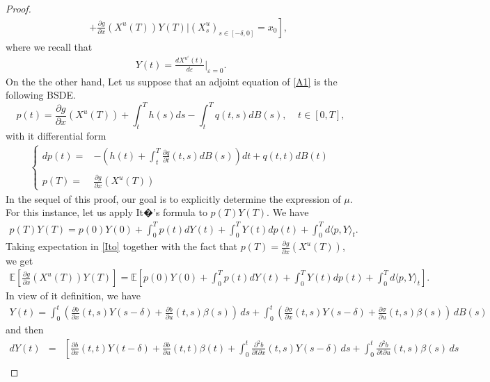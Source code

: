 \documentclass[12pt]{article}
\theoremstyle{remark}
\numberwithin{equation}{section}
\def\E{\mathbb E}
\def\E{\mathbb E}
\begin{document}
\begin{proof}
\begin{eqnarray}
&&\left.+\frac{\partial g}{\partial x}(X^{u}(T))Y(T)\Big|(X^{u}_s)_{s\in[-\delta,0]}=x_0 \right],  
\end{eqnarray}
where we recall that
\begin{eqnarray*}
	Y(t)=\frac{dX^{u^{\varepsilon}}(t)}{d\varepsilon}|_{\varepsilon=0}.
\end{eqnarray*}
On the the other hand, Let us suppose that an adjoint equation of \eqref{A1} is 
the following BSDE.
\begin{equation*}
p(t) = \frac{\partial g}{\partial x}(X^{u}(T))+\int_{t}^{T}h(s)ds - \int_{t}^{T}q(t,s)dB(s), \;\;\;\; t\in[0,T],
\end{equation*}
with it differential form
\begin{eqnarray}\label{PP}
\left\{
\begin{array}{ll}
	dp(t) =& -\left(h(t)+\displaystyle\int_{t}^{T}\frac{\partial q}{\partial t}(t,s) dB(s)\right)dt + q(t,t)dB(t)	\\\\
p(T)=& \frac{\partial g}{\partial x}(X^{u}(T))	
\end{array}
	\right.
\end{eqnarray}
In the sequel of this proof, our goal is to explicitly determine the expression of $\mu$. For this instance, let us apply It�'s formula to  $p(T)Y(T)$. We have
\begin{eqnarray}\label{Ito}
p(T)Y(T)=p(0)Y(0)+\int_0^T p(t)dY(t)+\int_0^TY(t)dp(t)+\int_0^Td\langle p,Y\rangle_t.
\end{eqnarray}
Taking expectation in \eqref{Ito} together with the fact that $p(T)=\frac{\partial g}{\partial x}(X^{u}(T))$, we get
\begin{eqnarray}\label{Eq001}
\E\left[\frac{\partial g}{\partial x}(X^{u}(T))Y(T)\right]=\E \left[ p(0)Y(0)+\int_0^T p(t)dY(t)+\int_0^TY(t)dp(t)+\int_0^Td\langle p,Y\rangle_t\right].
\end{eqnarray}
In view of it definition, we have
\begin{eqnarray*}
Y(t)= \int_{0}^{t}\left(\frac{\partial b}{\partial x}(t,s)Y(s-\delta)
+ \frac{\partial b}{\partial u}(t,s)\beta(s)\right) \,ds 
+\int_{0}^{t}\left(\frac{\partial \sigma}{\partial x}(t,s)Y(s-\delta)
+ \frac{\partial \sigma}{\partial u}(t,s)\beta(s)\right) \,dB(s)
\end{eqnarray*}
and then
\begin{eqnarray*}\label{YY}
dY(t)&=& 
\left[\frac{\partial b}{\partial x}(t,t)Y(t-\delta)+ \frac{\partial b}{\partial u}(t,t)\beta(t)+ \int_{0}^{t}\frac{\partial^{2} b}{\partial t \partial x}(t,s)Y(s-\delta)\,ds + \int_{0}^{t}\frac{\partial^{2} b}{\partial t \partial u}(t,s)\beta(s)\,ds\right.\nonumber \\

\end{eqnarray*}
\end{proof}
\end{document}
